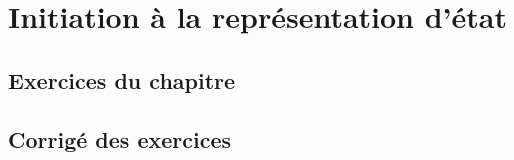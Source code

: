 \chapter{Initiation à la représentation d'état\label{chap-repreEtat}}
\minitoc

\newpage
\section*{Exercices du chapitre}


\exercice{}
\question

\newpage
\section*{Corrigé des exercices}


